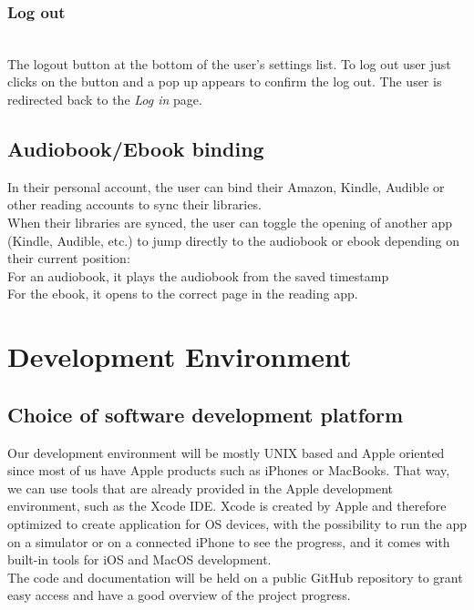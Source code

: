 \documentclass[conference]{IEEEtran}
\begin{document}
\subsubsection{Log out}\hfill\\
The logout button at the bottom of the user's settings list. To log out user just clicks on the button and a pop up appears to confirm the log out. The user is redirected back to the \textit{Log in} page.\\


\subsection{Audiobook/Ebook binding}
In their personal account, the user can bind their Amazon, Kindle, Audible or other reading accounts to sync their libraries.\\
When their libraries are synced, the user can toggle the opening of another app (Kindle, Audible, etc.) to jump directly to the audiobook or ebook depending on their current position:\\
For an audiobook, it plays the audiobook from the saved timestamp\\
For the ebook, it opens to the correct page in the reading app.\\


\section{Development Environment} 
\subsection{Choice of software development platform}

Our development environment will be mostly UNIX based and Apple oriented since most of us have Apple products such as iPhones or MacBooks. That way, we can use tools that are already provided in the Apple development environment, such as the Xcode IDE. Xcode is created by Apple and therefore optimized to create application for OS devices, with the possibility to run the app on a simulator or on a connected iPhone to see the progress, and it comes with built-in tools for iOS and MacOS development.\\
The code and documentation will be held on a public GitHub repository to grant easy access and have a good overview of the project progress.\\ 
\end{document}
